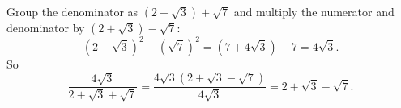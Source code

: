 Group the denominator as $\left(2+\sqrt3\right)+\sqrt7$ and multiply the numerator and denominator by $\left(2+\sqrt3\right)-\sqrt7$:
\[\left(2+\sqrt3\right)^2-\left(\sqrt7\right)^2=\left(7+4\sqrt3\right)-7=4\sqrt3 .\]
So
\[\dfrac{4\sqrt3}{2+\sqrt3+\sqrt7}=\dfrac{4\sqrt3\left(2+\sqrt3-\sqrt7\right)}{4\sqrt3}=\boxed{2+\sqrt3-\sqrt7}.\]
